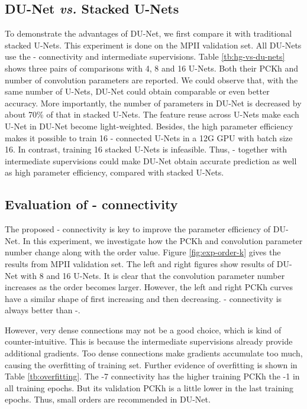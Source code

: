 \documentclass[runningheads]{llncs}
\begin{document}
\subsection{DU-Net {\it vs.} Stacked U-Nets}
To demonstrate the advantages of DU-Net, we first compare it with traditional stacked U-Nets. This experiment is done on the MPII validation set. All DU-Nets use the - connectivity and intermediate supervisions. Table \ref{tb:hg-vs-du-nets} shows three pairs of comparisons with 4, 8 and 16 U-Nets. Both their PCKh and number of convolution parameters are reported. We could observe that, with the same number of U-Nets, DU-Net could obtain comparable or even better accuracy. More importantly, the number of parameters in DU-Net is decreased by about 70\% of that in stacked U-Nets. The feature reuse across U-Nets make each U-Net in DU-Net become light-weighted. Besides, the high parameter efficiency makes it possible to train 16 - connected U-Nets in a 12G GPU with batch size 16. In contrast, training 16 stacked U-Nets is infeasible. Thus, - together with intermediate supervisions could make DU-Net obtain accurate prediction as well as high parameter efficiency, compared with stacked U-Nets.




\subsection{Evaluation of - connectivity}
The proposed - connectivity is key to improve the parameter efficiency of DU-Net. In this experiment, we investigate how the PCKh and convolution parameter number change along with the order value. Figure \ref{fig:exp-order-k} gives the results from MPII validation set. The left and right figures show results of DU-Net with 8 and 16 U-Nets. It is clear that the convolution parameter number increases as the order becomes larger. However, the left and right PCKh curves have a similar shape of first increasing and then decreasing. - connectivity is always better than -. 

However, very dense connections may not be a good choice, which is kind of counter-intuitive. This is because the intermediate supervisions already provide additional gradients. Too dense connections make gradients accumulate too much, causing the overfitting of training set. Further evidence of overfitting is shown in Table \ref{tb:overfitting}. The -7 connectivity has the higher training PCKh the -1 in all training epochs. But its validation PCKh is a little lower in the last training epochs. Thus, small orders are recommended in DU-Net.
\end{document}
